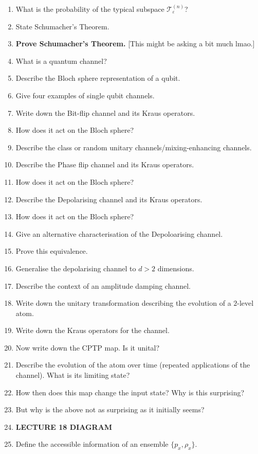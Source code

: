 \documentclass{article}
\newcommand{\mc}[1]{\mathcal{#1}}
\newcommand{\T}{\mc{T}}
\newcommand{\eps}{\varepsilon}
\begin{document}
\begin{enumerate}
    \item What is the probability of the typical subspace $\T_\eps^{(n)}$?
    \item State Schumacher's Theorem.
    \item \textbf{Prove Schumacher's Theorem.} [This might be asking a bit much lmao.]
    \item What is a quantum channel?
    \item Describe the Bloch sphere representation of a qubit.
    \item Give four examples of single qubit channels.
    \item Write down the Bit-flip channel and its Kraus operators.
    \item How does it act on the Bloch sphere?
    \item Describe the class or random unitary channels/mixing-enhancing channels.
    \item Describe the Phase flip channel and its Kraus operators.
    \item How does it act on the Bloch sphere?
    \item Describe the Depolarising channel and its Kraus operators.
    \item How does it act on the Bloch sphere?
    \item Give an alternative characterisation of the Depoloarising channel.
    \item Prove this equivalence.
    \item Generalise the depolarising channel to $d > 2$ dimensions.
    \item Describe the context of an amplitude damping channel.
    \item Write down the unitary transformation describing the evolution of a $2$-level atom.
    \item Write down the Kraus operators for the channel.
    \item Now write down the CPTP map. Is it unital?
    \item Describe the evolution of the atom over time (repeated applications of the channel). What is its limiting state?
    \item How then does this map change the input state? Why is this surprising?
    \item But why is the above not as surprising as it initially seems?
    \item \textbf{LECTURE 18 DIAGRAM}
    \item Define the accessible information of an ensemble $\{p_x,\rho_x\}$.

\end{enumerate}
\end{document}
